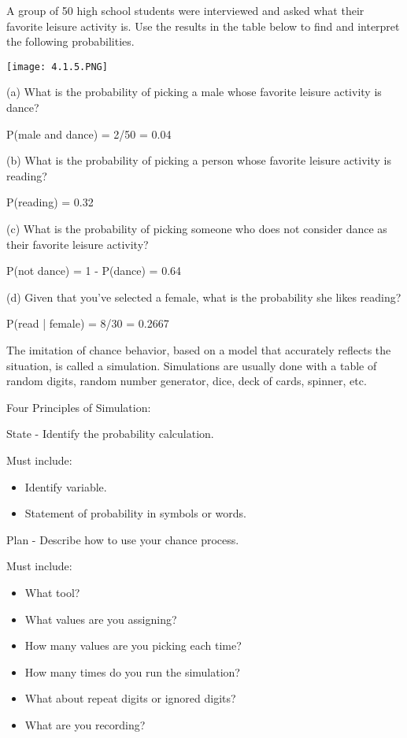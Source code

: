 \documentclass[../stats.tex]{subfiles}
\begin{document}
\begin{example}
    A group of 50 high school students were interviewed and asked what their favorite leisure activity is. Use the results in the table below to find and interpret the following probabilities.
    \begin{center}
        \texttt{[image: 4.1.5.PNG]}
    \end{center}

    (a) What is the probability of picking a male whose favorite leisure activity is dance?

    P(male and dance) = 2/50 = 0.04

    (b) What is the probability of picking a person whose favorite leisure activity is reading?

    P(reading) = 0.32

    (c) What is the probability of picking someone who does not consider dance as their favorite leisure activity?

    P(not dance) = 1 - P(dance) = 0.64

    (d) Given that you've selected a female, what is the probability she likes reading?

    P(read | female) = 8/30 = 0.2667
\end{example}

The imitation of chance behavior, based on a model that accurately reflects the situation, is called a simulation. Simulations are usually done with a table of random digits, random number generator, dice, deck of cards, spinner, etc.

Four Principles of Simulation:

State - Identify the probability calculation.

Must include:
\begin{itemize}
    \item Identify variable.
    \item Statement of probability in symbols or words.
\end{itemize}

Plan - Describe how to use your chance process.

Must include:
\begin{itemize}
    \item What tool?
    \item What values are you assigning?
    \item How many values are you picking each time?
    \item How many times do you run the simulation?
    \item What about repeat digits or ignored digits?
    \item What are you recording?
\end{itemize}
\end{document}
